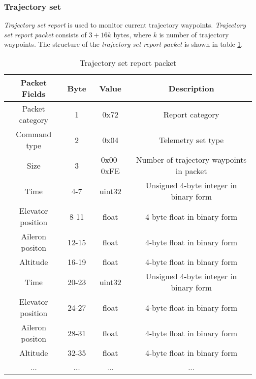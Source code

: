 \subsubsection{Trajectory set}
\label{sec:TrajectorySetReport}
\textit{Trajectory set report} is used to monitor current trajectory waypoints. 
\textit{Trajectory set report packet} consists of $3+16k$ bytes, where $k$ is number of trajectory waypoints. The structure of the \textit{trajectory set report packet} is shown in table \ref{tab:trajectorySetReport}.
\begin{table}[H]
\begin{center}
\begin{tabular}{c c c c}
\toprule
\rowcolor[HTML]{FFFC9E} 
\textbf{Packet Fields} & \textbf{Byte} & \textbf{Value} & \textbf{Description}                     \\ \midrule
Packet category        & 1             & 0x72           & Report category                          \\ [1ex] 
Command type           & 2             & 0x04           & Telemetry set type                       \\ [1ex] 
Size                   & 3             & 0x00-0xFE      & Number of trajectory waypoints in packet \\ [1ex] 
Time                   & 4-7           & uint32         & Unsigned 4-byte integer in binary form    \\ [1ex] 
Elevator position      & 8-11          & float          & 4-byte float in binary form               \\ [1ex] 
Aileron positon        & 12-15         & float          & 4-byte float in binary form               \\ [1ex] 
Altitude               & 16-19         & float          & 4-byte float in binary form               \\ [1ex] 
Time                   & 20-23         & uint32         & Unsigned 4-byte integer in binary form    \\ [1ex] 
Elevator position      & 24-27         & float          & 4-byte float in binary form               \\ [1ex] 
Aileron positon        & 28-31         & float          & 4-byte float in binary form               \\ [1ex] 
Altitude               & 32-35         & float          & 4-byte float in binary form               \\ [1ex] 
...                    & ...           & ...            & ...      
\\  [1ex]  \bottomrule                               
\end{tabular}
\end{center}
\caption{Trajectory set report packet}
\label{tab:trajectorySetReport}
\end{table}

